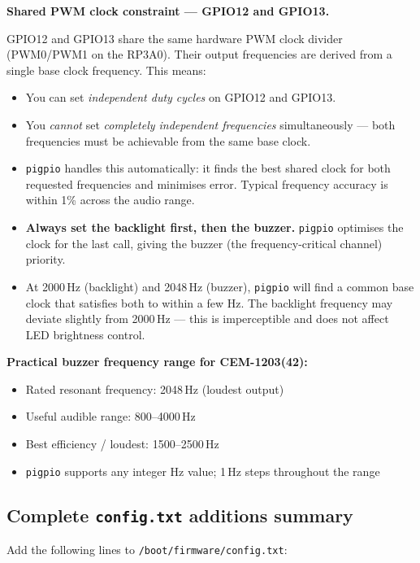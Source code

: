 \documentclass[11pt,a4paper]{article}
\begin{document}
\begin{warnbox}
\textbf{Shared PWM clock constraint --- GPIO12 and GPIO13.}

GPIO12 and GPIO13 share the same hardware PWM clock divider (PWM0/PWM1 on the RP3A0).
Their output frequencies are derived from a single base clock frequency.
This means:
\begin{itemize}[noitemsep]
  \item You can set \emph{independent duty cycles} on GPIO12 and GPIO13.
  \item You \emph{cannot} set \emph{completely independent frequencies} simultaneously ---
        both frequencies must be achievable from the same base clock.
  \item \texttt{pigpio} handles this automatically: it finds the best shared clock
        for both requested frequencies and minimises error.
        Typical frequency accuracy is within 1\% across the audio range.
  \item \textbf{Always set the backlight first, then the buzzer.}
        \texttt{pigpio} optimises the clock for the last call,
        giving the buzzer (the frequency-critical channel) priority.
  \item At 2000\,Hz (backlight) and 2048\,Hz (buzzer), \texttt{pigpio} will find
        a common base clock that satisfies both to within a few Hz.
        The backlight frequency may deviate slightly from 2000\,Hz ---
        this is imperceptible and does not affect LED brightness control.
\end{itemize}

\textbf{Practical buzzer frequency range for CEM-1203(42):}
\begin{itemize}[noitemsep]
  \item Rated resonant frequency: 2048\,Hz (loudest output)
  \item Useful audible range: 800--4000\,Hz
  \item Best efficiency / loudest: 1500--2500\,Hz
  \item \texttt{pigpio} supports any integer Hz value; 1\,Hz steps throughout the range
\end{itemize}
\end{warnbox}

\subsection{Complete \texttt{config.txt} additions summary}

Add the following lines to \texttt{/boot/firmware/config.txt}:
\end{document}
